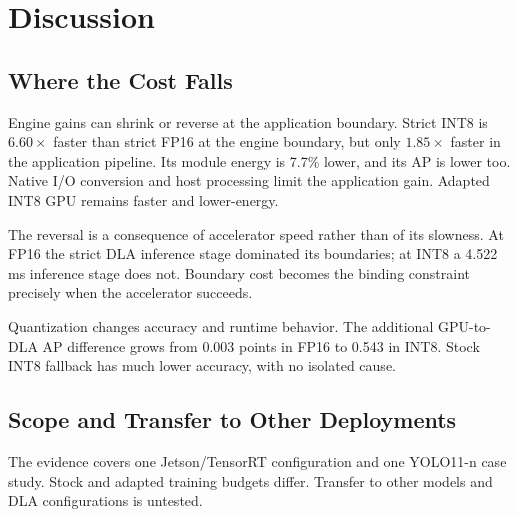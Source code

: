 \section{Discussion}
\label{sec:discussion}
\subsection{Where the Cost Falls}
Engine gains can shrink or reverse at the application boundary. Strict INT8
is $6.60\times$ faster than strict FP16 at the engine boundary, but only
$1.85\times$ faster in the application pipeline. Its module energy is 7.7\%
lower, and its AP is lower too. Native I/O conversion and host processing limit the application gain.
Adapted INT8 GPU remains faster and lower-energy.

The reversal is a consequence of accelerator speed rather than of its slowness.
At FP16 the strict DLA inference stage dominated its boundaries; at INT8 a
4.522\,ms inference stage does not. Boundary cost becomes the binding constraint
precisely when the accelerator succeeds.

Quantization changes accuracy and runtime behavior. The additional
GPU-to-DLA AP difference grows from 0.003 points in FP16 to 0.543 in INT8.
Stock INT8 fallback has much lower accuracy, with no isolated cause.

\subsection{Scope and Transfer to Other Deployments}
The evidence covers one Jetson/TensorRT configuration and one YOLO11-n case
study. Stock and adapted training budgets differ.
Transfer to other models and DLA configurations is untested.
